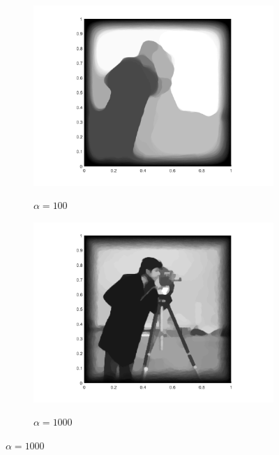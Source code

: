 \begin{figure}[!ht]
  \vspace{-3mm}

  \begin{subfigure}{.32\linewidth}
    \caption{$\alpha=100$}
    \includegraphics[trim = 100 30 80 20, clip, width=\linewidth]
      {pictures/chapIntroduction/denoiseSNR15/alpha100/solutionGrayscale.png}
    \label{fig:snr15alpha100}
  \end{subfigure}
  \begin{subfigure}{.32\linewidth}
    \caption{$\alpha=1000$}
    \includegraphics[trim = 100 30 80 20, clip, width=\linewidth]
      {pictures/chapIntroduction/denoiseSNR15/alpha1000/solutionGrayscale.png}
    \label{fig:snr15alpha1000}
  \end{subfigure}

\end{figure}
